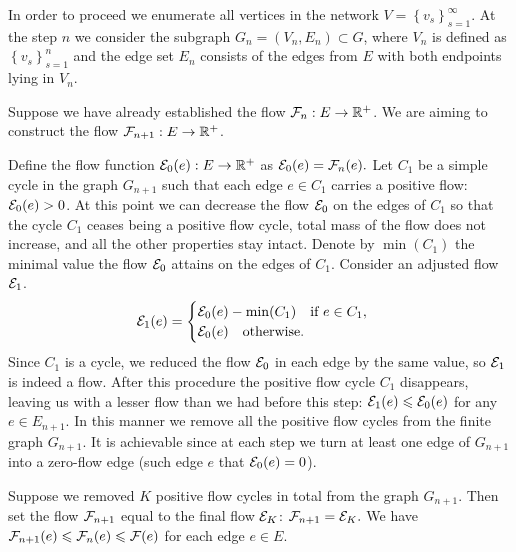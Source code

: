 \documentclass[12pt,oneside,a4paper]{amsart}
\begin{document}
        In order to proceed we enumerate all vertices in the network $V = \left\{v_s\right\}_{s=1}^\infty$.
        At the step $n$ we consider the subgraph $G_n = (V_n, E_n) \subset G$, where $V_n$ is defined as $\left\{v_s\right\}_{s=1}^n$
          and the edge set $E_n$ consists of the edges from $E$ with both endpoints lying in $V_n$.

        Suppose we have already established the flow $\flowposn{n}: E \to \mathbb{R}^{+}$.
        We are aiming to construct the flow $\flowposn{n+1}: E \to \mathbb{R}^{+}$.

        Define the flow function $\cal{E}_0(e): E \to \mathbb{R}^{+}$ as $\cal{E}_0(e) = \flowposn{n}(e).$
        Let $C_1$ be a simple cycle in the graph $G_{n + 1}$ such that each edge $e \in C_1$ carries
          a positive flow: $\cal{E}_0(e) > 0$.
        At this point we can decrease the flow $\cal{E}_0$ on the edges of $C_1$ so that the cycle $C_1$
          ceases being a positive flow cycle, total mass of the flow does not increase, and all the other properties stay intact.
        Denote by $\min(C_1)$ the minimal value the flow $\cal{E}_0$ attains on the edges of $C_1$.
        Consider an adjusted flow $\cal{E}_1$.
        \begin{equation*}
          \cal{E}_1(e) =
          \begin{cases}
            \cal{E}_0(e) - \min(C_1) \quad \text{if } e \in C_1,\\
            \cal{E}_0(e) \quad \text{otherwise}.
          \end{cases}
        \end{equation*}
        Since $C_1$ is a cycle, we reduced the flow $\cal{E}_0$ in each edge by the same value,
          so $\cal{E}_1$ is indeed a flow.
        After this procedure the positive flow cycle $C_1$ disappears,
          leaving us with a lesser flow than we had before this step: $\cal{E}_1(e) \leq \cal{E}_0(e)$ for any $e \in E_{n+1}.$
        In this manner we remove all the positive flow cycles from the finite graph $G_{n + 1}$.
        It is achievable since at each step we turn at least one edge of $G_{n + 1}$
          into a zero-flow edge (such edge $e$ that $\cal{E}_0(e) = 0$).

        Suppose we removed $K$ positive flow cycles in total from the graph $G_{n + 1}$.
        Then set the flow $\flowposn{n+1}$ equal to the final flow $\cal{E}_K$: $\flowposn{n+1} = \cal{E}_K.$
        We have $\flowposn{n+1}(e) \leq \flowposn{n}(e) \leq \flowpos(e)$ for each edge $e \in E$.
\end{document}
